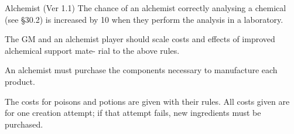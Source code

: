 \begin{Chapter}{Alchemist (Ver 1.1)}
The  chance  of  an  alchemist  correctly  analysing  a 
chemical (see §30.2) is increased by 10 when they 
perform the analysis in a laboratory. 

The GM and an alchemist player should scale costs 
and  effects  of  improved  alchemical  support  mate-
rial to the above rules. 

An  alchemist  must  purchase  the  components 
necessary to manufacture each product. 

The  costs  for  poisons  and  potions  are  given  with 
their  rules.  All  costs  given  are  for  one  creation 
attempt; if that attempt fails, new ingredients must 
be purchased.

\end{Chapter}
